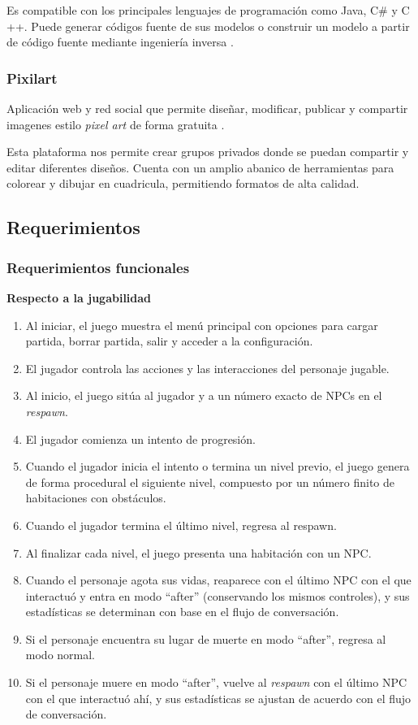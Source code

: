 \documentclass[12pt,twoside]{article}
\begin{document}
	Es compatible con los principales lenguajes de programación como Java, C\# y C ++. Puede generar códigos fuente de sus modelos o construir un modelo a partir de código fuente mediante ingeniería	inversa \cite{app: star}. 
	
	\subsubsection{Pixilart}
	Aplicación web y red social que permite diseñar, modificar, publicar y compartir imagenes estilo \textit{pixel art} de forma gratuita \cite{app: pixilart}.
	
	Esta plataforma nos permite crear grupos privados donde se puedan compartir y editar diferentes diseños. Cuenta con un amplio abanico de herramientas para colorear y dibujar en cuadricula, permitiendo formatos de alta calidad.
	
	\clearpage
	\subsection{Requerimientos}
	
	\subsubsection{Requerimientos funcionales}
	\textbf{Respecto a la jugabilidad} 
	\begin{enumerate}[label=RF\arabic*]
		\item Al iniciar, el juego muestra el menú principal con opciones para cargar partida, borrar partida, salir y acceder a la configuración.
		\item El jugador controla las acciones y las interacciones del personaje jugable.
		\item Al inicio, el juego sitúa al jugador y a un número exacto de NPCs en el \textit{respawn}.
		\item El jugador comienza un intento de progresión.
		\item Cuando el jugador inicia el intento o termina un nivel previo, el juego genera de forma procedural el siguiente nivel, compuesto por un número finito de habitaciones con obstáculos.
		\item Cuando el jugador termina el último nivel, regresa al respawn.
		\item Al finalizar cada nivel, el juego presenta una habitación con un NPC.
		\item Cuando el personaje agota sus vidas, reaparece con el último NPC con el que interactuó y entra en modo ``after'' (conservando los mismos controles), y sus estadísticas se determinan con base en el flujo de conversación.
		\item Si el personaje encuentra su lugar de muerte en modo ``after'', regresa al modo normal.
		\item Si el personaje muere en modo ``after'', vuelve al \textit{respawn} con el último NPC con el que interactuó ahí, y sus estadísticas se ajustan de acuerdo con el flujo de conversación.
	\end{enumerate}	
	
\end{document}
